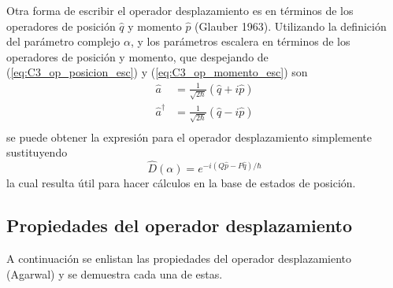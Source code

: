 Otra forma de escribir el operador desplazamiento es en términos de los operadores de posición $\hat{q}$ y momento $\hat{p}$ (Glauber 1963). Utilizando la definición del parámetro complejo $\alpha$, y los parámetros escalera en términos de los operadores de posición y momento, que despejando de (\ref{eq:C3_op_posicion_esc}) y (\ref{eq:C3_op_momento_esc}) son
\begin{align}
  \hat{a}           & = \frac{1}{\sqrt{2\hbar}}(\hat{q} + i\hat{p}) \\
  \hat{a}^{\dagger} & = \frac{1}{\sqrt{2\hbar}}(\hat{q} - i\hat{p}) \\
\end{align}
se puede obtener la expresión para el operador desplazamiento simplemente sustituyendo
\begin{equation}
  \hat{D}(\alpha) = e^{-i(Q\hat{p}-P\hat{q})/\hbar}
\end{equation}
la cual resulta útil para hacer cálculos en la base de estados de posición.
\subsection{Propiedades del operador desplazamiento}

A continuación se enlistan las propiedades del operador desplazamiento (Agarwal) y se demuestra cada una de estas.

